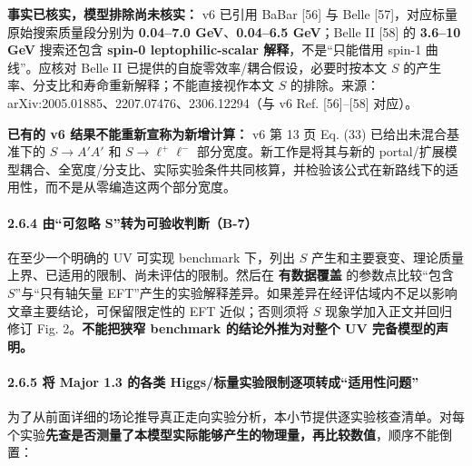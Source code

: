 \documentclass[
]{article}
\begin{document}
\textbf{事实已核实，模型排除尚未核实：} v6 已引用 BaBar {[}56{]} 与
Belle {[}57{]}，对应标量原始搜索质量段分别为 \textbf{0.04--7.0
GeV}、\textbf{0.04--6.5 GeV}；Belle II {[}58{]} 的 \textbf{3.6--10 GeV}
搜索还包含 \textbf{spin-0 leptophilic-scalar 解释}，不是``只能借用
spin-1 曲线''。应核对 Belle II 已提供的自旋零效率/耦合假设，必要时按本文
\(S\) 的产生率、分支比和寿命重新解释；不能直接视作本文 \(S\)
的排除。来源：arXiv:2005.01885、2207.07476、2306.12294（与 v6 Ref.
{[}56{]}--{[}58{]} 对应）。

\textbf{已有的 v6 结果不能重新宣称为新增计算：} v6 第 13 页 Eq. (33)
已给出未混合基准下的 \(S\to A'A'\) 和 \(S\to\ell^+\ell^-\)
部分宽度。新工作是将其与新的
portal/扩展模型耦合、全宽度/分支比、实际实验条件共同核算，并检验该公式在新路线下的适用性，而不是从零编造这两个部分宽度。

\paragraph{2.6.4 由``可忽略
S''转为可验收判断（B-7）}\label{ux7531ux53efux5ffdux7565-sux8f6cux4e3aux53efux9a8cux6536ux5224ux65adb-7}

在至少一个明确的 UV 可实现 benchmark 下，列出 \(S\)
产生和主要衰变、理论质量上界、已适用的限制、尚未评估的限制。然后在
\textbf{有数据覆盖} 的参数点比较``包含 \(S\)''与``只有轴矢量
EFT''产生的实验解释差异。如果差异在经评估域内不足以影响文章主要结论，可保留限定性的
EFT 近似；否则须将 \(S\) 现象学加入正文并回归修订 Fig.
2。\textbf{不能把狭窄 benchmark 的结论外推为对整个 UV 完备模型的声明。}

\paragraph{2.6.5 将 Major 1.3 的各类
Higgs/标量实验限制逐项转成``适用性问题''}\label{ux5c06-major-1.3-ux7684ux5404ux7c7b-higgsux6807ux91cfux5b9eux9a8cux9650ux5236ux9010ux9879ux8f6cux6210ux9002ux7528ux6027ux95eeux9898}

为了从前面详细的场论推导真正走向实验分析，本小节提供逐实验核查清单。对每个实验\textbf{先查是否测量了本模型实际能够产生的物理量，再比较数值}，顺序不能倒置：
\end{document}
